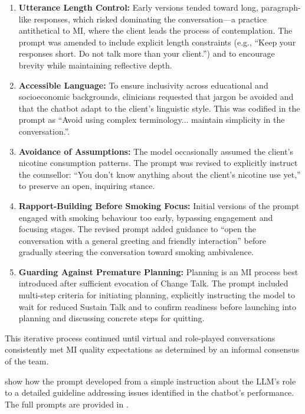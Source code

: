 \begin{enumerate}
	\item \textbf{Utterance Length Control:} Early versions tended toward long, paragraph-like responses, which risked dominating the conversation---a practice antithetical to MI, where the client leads the process of contemplation. The prompt was amended to include explicit length constraints (e.g., ``Keep your responses short. Do not talk more than your client.'') and to encourage brevity while maintaining reflective depth.

	\item \textbf{Accessible Language:} To ensure inclusivity across educational and socioeconomic backgrounds, clinicians requested that jargon be avoided and that the chatbot adapt to the client's linguistic style. This was codified in the prompt as ``Avoid using complex terminology... maintain simplicity in the conversation.''.

	\item \textbf{Avoidance of Assumptions:} The model occasionally assumed the client's nicotine consumption patterns. The prompt was revised to explicitly instruct the counsellor: ``You don't know anything about the client's nicotine use yet,'' to preserve an open, inquiring stance.

	\item \textbf{Rapport-Building Before Smoking Focus:} Initial versions of the prompt engaged with smoking behaviour too early, bypassing engagement and focusing stages. The revised prompt added guidance to ``open the conversation with a general greeting and friendly interaction'' before gradually steering the conversation toward smoking ambivalence.

	\item \textbf{Guarding Against Premature Planning:} Planning is an MI process best introduced after sufficient evocation of Change Talk. The prompt included multi-step criteria for initiating planning, explicitly instructing the model to wait for reduced Sustain Talk and to confirm readiness before launching into planning and discussing concrete steps for quitting.


\end{enumerate}



This iterative process continued until virtual and role-played conversations consistently met MI quality expectations as determined by an informal consensus of the team.


 show how the prompt developed from a simple instruction about the LLM's role to a detailed guideline addressing issues identified in the chatbot's performance. The full prompts are provided in .


